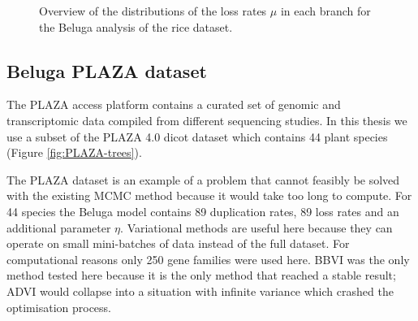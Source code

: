 \begin{figure}
    \noindent{}
	\caption[Rice Beluga duplication rates]{Overview of the distributions of the loss rates $\mu$ in each branch for the Beluga analysis of the rice dataset.}
    \label{fig:rice-lambda}
\end{figure}


\subsection{Beluga PLAZA dataset}

\par The PLAZA access platform \parencite{PLAZA-paper-1, PLAZA-paper-2} contains a curated set of genomic and transcriptomic data compiled from different sequencing studies. In this thesis we use a subset of the PLAZA 4.0 dicot dataset which contains 44 plant species (Figure \ref{fig:PLAZA-trees}).
\medskip
\par The PLAZA dataset is an example of a problem that cannot feasibly be solved with the existing MCMC method because it would take too long to compute. For 44 species the Beluga model contains 89 duplication rates, 89 loss rates and an additional parameter $\eta$. Variational methods are useful here because they can operate on small mini-batches of data instead of the full dataset. For computational reasons only 250 gene families were used here. BBVI was the only method tested here because it is the only method that reached a stable result; ADVI would collapse into a situation with infinite variance which crashed the optimisation process.

